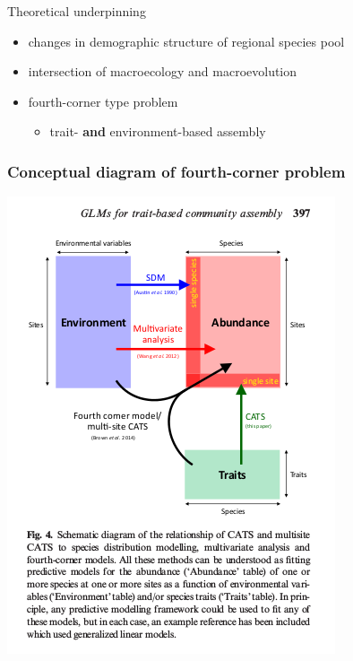\documentclass{beamer}
\begin{document}
\begin{frame}
  \begin{block}{Theoretical underpinning}
    \begin{itemize}
      \item changes in demographic structure of regional species pool
      \item intersection of macroecology and macroevolution
      \item fourth-corner type problem
        \begin{itemize}
          \item trait- \textbf{and} environment-based assembly
        \end{itemize}
    \end{itemize}
  \end{block}
\end{frame}

\begin{frame}
  \frametitle{Conceptual diagram of fourth-corner problem}

  \begin{center}
    \includegraphics[width=\textwidth,height=0.7\textheight,keepaspectratio=true]{figure/warton_4corner}
  \end{center}

\end{frame}
\end{document}
